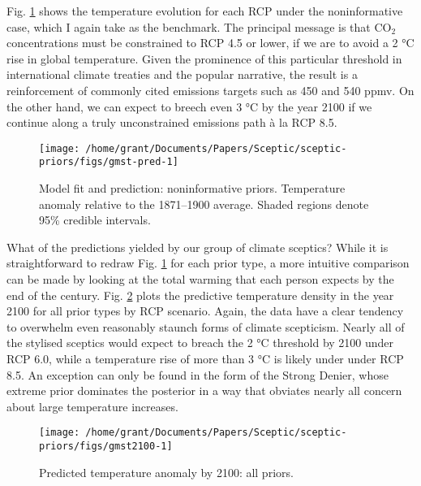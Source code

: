 \documentclass[smallextended]{svjour3}       %
\begin{document}
Fig. \ref{fig:gmst-pred} shows the temperature evolution for each RCP
under the noninformative case, which I again take as the benchmark. The
principal message is that CO\(_2\) concentrations must be constrained to
RCP 4.5 or lower, if we are to avoid a 2 °C rise in global temperature.
Given the prominence of this particular threshold in international
climate treaties and the popular narrative, the result is a
reinforcement of commonly cited emissions targets such as 450 and 540
ppmv. On the other hand, we can expect to breech even 3 °C by the year
2100 if we continue along a truly unconstrained emissions path à la RCP
8.5.

\begin{figure}

{\centering \texttt{[image: /home/grant/Documents/Papers/Sceptic/sceptic-priors/figs/gmst-pred-1]} 

}

\caption{Model fit and prediction: noninformative priors. Temperature anomaly relative to the 1871--1900 average. Shaded regions denote 95\% credible intervals.}\label{fig:gmst-pred}
\end{figure}

What of the predictions yielded by our group of climate sceptics? While
it is straightforward to redraw Fig. \ref{fig:gmst-pred} for each prior
type, a more intuitive comparison can be made by looking at the total
warming that each person expects by the end of the century. Fig.
\ref{fig:gmst2100} plots the predictive temperature density in the year
2100 for all prior types by RCP scenario. Again, the data have a clear
tendency to overwhelm even reasonably staunch forms of climate
scepticism. Nearly all of the stylised sceptics would expect to breach
the 2 °C threshold by 2100 under RCP 6.0, while a temperature rise of
more than 3 °C is likely under under RCP 8.5. An exception can only be
found in the form of the Strong Denier, whose extreme prior dominates
the posterior in a way that obviates nearly all concern about large
temperature increases.

\begin{figure}

{\centering \texttt{[image: /home/grant/Documents/Papers/Sceptic/sceptic-priors/figs/gmst2100-1]} 

}

\caption{Predicted temperature anomaly by 2100: all priors.}\label{fig:gmst2100}
\end{figure}
\end{document}
